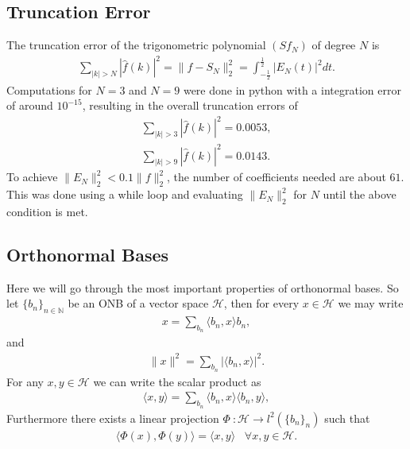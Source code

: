 \subsection{Truncation Error}
The truncation error of the trigonometric polynomial $(Sf_N)$ of degree $N$ is
\begin{align}
    \sum_{|k| > N} |\hat{f}(k)|^2 = \lVert f - S_N\rVert_2^2 =
    \int_{-\frac{1}{2}}^{\frac{1}{2}} |E_N(t)|^2 dt.
\end{align}
Computations for $N = 3$ and $N = 9$ were done in python with a integration error of
around $10^{-15}$, resulting in the overall truncation errors of
\begin{align}
    \sum_{|k| > 3} |\hat{f}(k)|^2 = 0.0053,\\
    \sum_{|k| > 9} |\hat{f}(k)|^2 = 0.0143.
\end{align}
To achieve $\lVert E_N\rVert^2_2 < 0.1 \lVert f \rVert^2_2$, the number of
coefficients needed are about $61$. This was done using a while loop and
evaluating $\lVert E_N\rVert^2_2$ for $N$ until the above condition is met.

\subsection{Orthonormal Bases}
Here we will go through the most important properties of orthonormal bases.
So let $\{b_n\}_{n\in \mathbb{N}}$ be an ONB of a vector space $\mathcal{H}$,
then for every $x\in \mathcal{H}$ we may write
\begin{align}
    x = \sum_{b_n} \langle b_n, x\rangle b_n,
\end{align}
and
\begin{align}
    \lVert x \rVert^2 = \sum_{b_n} |\langle b_n, x\rangle|^2.
\end{align}
For any $x, y \in \mathcal{H}$ we can write the scalar product as
\begin{align}
    \langle x, y\rangle = \sum_{b_n} \langle b_n, x\rangle \langle b_n,
    y\rangle,
\end{align}
Furthermore there exists a linear projection $\Phi\ : \mathcal{H}
\rightarrow l^2(\{b_n\}_n)$ such that
\begin{align}
    \langle \Phi(x), \Phi(y)\rangle = \langle x, y \rangle\;\;\; \forall x, y
    \in \mathcal{H}.
\end{align}

